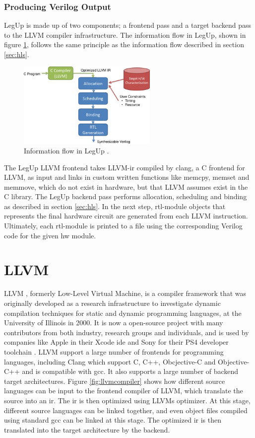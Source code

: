 \subsubsection{Producing Verilog Output}
LegUp is made up of two components; a frontend pass and a target backend pass to the LLVM compiler infrastructure. 
The information flow in LegUp, shown in figure \ref{fig:legupflow}, follows the same principle as the information flow described in section \ref{sec:hls}.
\begin{figure}[hbpt]
\centering
\includegraphics[width=0.6\textwidth]{../figs/LegUpFlow.png}
\caption{\label{fig:legupflow}Information flow in LegUp \cite{legupmaual}.}
\end{figure}
The LegUp LLVM frontend takes LLVM-\gls{ir} compiled by clang, a C frontend for LLVM, as input and links in custom written functions like memcpy, memset and memmove, which do not exist in hardware, but that LLVM assumes exist in the C library. 
The LegUp backend pass performs allocation, scheduling and binding as described in section \ref{sec:hls}. In the next step, \gls{rtl}-module objects that represents the final hardware circuit are generated from each LLVM instruction. Ultimately, each \gls{rtl}-module is printed to a file using the corresponding Verilog code for the given \gls{hw} module.

\section{\label{sec:LLVM}LLVM}
LLVM \cite{LLVM:CGO04}, formerly Low-Level Virtual Machine, is a compiler framework that was originally developed as a research infrastructure to investigate dynamic compilation techniques for static and dynamic programming languages, at the University of Illinois in 2000. It is now a open-source project with many contributors from both industry, research groups and individuals, and is used by companies like Apple in their Xcode \gls{ide} \cite{llvmapple} and Sony for their PS4 developer toolchain \cite{llvmsony}. LLVM support a large number of frontends for programming languages, including Clang \cite{clang} which support C, C++, Obcjective-C and Objective-C++ and is compatible with \gls{gcc}. It also supports a large number of backend target architectures. Figure \ref{fig:llvmcompiler} shows how different source languages can be input to the frontend compiler of LLVM, which translate the source into an \gls{ir}. The \gls{ir} is then optimized using LLVMs optimizer. At this stage, different source languages can be linked together, and even object files compiled using standard \gls{gcc} can be linked at this stage. The optimized \gls{ir} is then translated into the target architecture by the backend.


